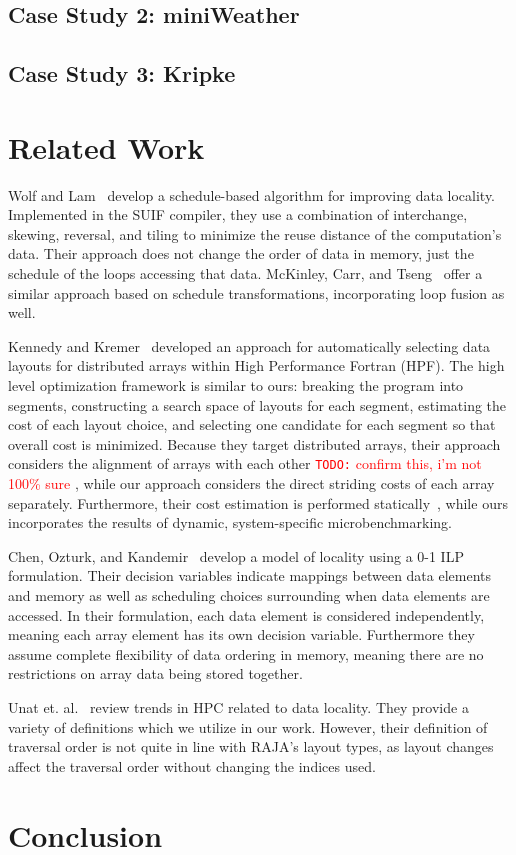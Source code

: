 \documentclass[sigconf, table]{acmart}
\newcommand{\todo}[1]{{\textcolor{red}{{\tt{TODO:}}\,\,#1 }}}
\begin{document}
\subsection{Case Study 2: miniWeather}

\subsection{Case Study 3: Kripke}

\section{Related Work}

Wolf and Lam~\cite{wolf1991data} develop a schedule-based algorithm for improving data locality. 
Implemented in the SUIF compiler, they use a combination of interchange, skewing, reversal, and tiling to minimize the reuse distance of the computation's data. 
Their approach does not change the order of data in memory, just the schedule of the loops accessing that data.
McKinley, Carr, and Tseng~\cite{mckinley1996improving} offer a similar approach based on schedule transformations, incorporating loop fusion as well.

Kennedy and Kremer~\cite{kennedy1995automatic} developed an approach for automatically selecting data layouts for distributed arrays within High Performance Fortran (HPF). 
The high level optimization framework is similar to ours: breaking the program into segments, constructing a search space of layouts for each segment, estimating the cost of each layout choice, and selecting one candidate for each segment so that overall cost is minimized. 
Because they target distributed arrays, their approach considers the alignment of arrays with each other \todo{confirm this, i'm not 100\% sure}, while our approach considers the direct striding costs of each array separately. 
Furthermore, their cost estimation is performed statically~\cite{bixby1994automatic}, while ours incorporates the results of dynamic, system-specific microbenchmarking.


Chen, Ozturk, and Kandemir~\cite{Chen2004ilp} develop a model of locality using a 0-1 ILP formulation. 
Their decision variables indicate mappings between data elements and memory as well as scheduling choices surrounding when data elements are accessed. 
In their formulation, each data element is considered independently, meaning each array element has its own decision variable. 
Furthermore they assume complete flexibility of data ordering in memory, meaning there are no restrictions on array data being stored together.

Unat et. al.~\cite{unat2017trends} review trends in HPC related to data locality. They provide a variety of definitions which we utilize in our work. However, their definition of traversal order is not quite in line with RAJA's layout types, as layout changes affect the traversal order without changing the indices used. 
\section{Conclusion}




\end{document}
